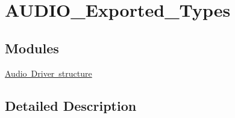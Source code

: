\hypertarget{group___a_u_d_i_o___exported___types}{}\section{A\+U\+D\+I\+O\+\_\+\+Exported\+\_\+\+Types}
\label{group___a_u_d_i_o___exported___types}
\subsection*{Modules}
\begin{DoxyCompactItemize}
\item 
\mbox{\hyperlink{group___a_u_d_i_o___driver__structure}{Audio Driver structure}}
\end{DoxyCompactItemize}


\subsection{Detailed Description}
